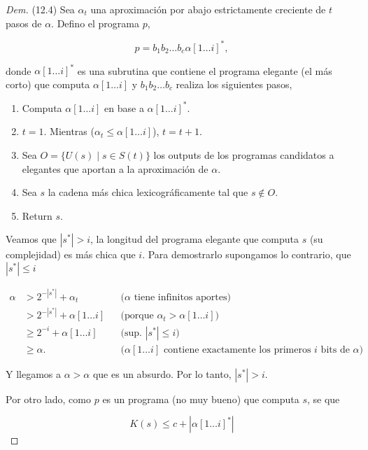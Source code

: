 \documentclass{article}
\theoremstyle{definition} %
\newcommand{\first}[2]{#2[1 \dots #1]}
\begin{document}
\begin{proof}[Dem](12.4)
    Sea $\alpha_t$ una aproximación por abajo estrictamente creciente de $t$
    pasos de $\alpha$. Defino el programa $p$,

    \[
        p = b_1 b_2 \dots b_c \first{i}{\alpha}^*,
    \]

    donde $\first{i}{\alpha}^*$ es una subrutina que contiene el programa
    elegante (el más corto) que computa $\first{i}{\alpha}$ y $b_1 b_2
    \dots b_c$ realiza los siguientes pasos,

    \begin{enumerate}
        \item Computa $\first{i}{\alpha}$ en base a
        $\first{i}{\alpha}^*$.
        \item $t = 1$. Mientras ($\alpha_t \leq \first{i}{\alpha}$), $t = t + 1$.
        \item Sea $O = \{ U(s) \mid s \in S(t) \}$ los outputs de los
        programas candidatos a elegantes que aportan a la aproximación de
        $\alpha$.
        \item Sea $s$ la cadena más chica lexicográficamente tal que $s \notin O$.
        \item Return $s$.
    \end{enumerate}

    Veamos que $|s^*| > i$, la longitud del programa elegante que computa $s$
    (su complejidad) es más chica que $i$. Para demostrarlo supongamos lo
    contrario, que $|s^*| \leq i$

    \begin{align*}
        \alpha 
        &> 2^{-|s^*|} + \alpha_t
            &&\text{($\alpha$ tiene infinitos aportes)}\\
        &> 2^{-|s^*|} + \first{i}{\alpha}
            &&\text{(porque $\alpha_t > \first{i}{\alpha}$)}\\
        &\geq 2^{-i} + \first{i}{\alpha}
            &&\text{(sup. $|s^*| \leq i$)}\\
        &\geq \alpha.
            &&\text{($\first{i}{\alpha}$ contiene exactamente los primeros $i$ bits de $\alpha$)}
    \end{align*}

    Y llegamos a $\alpha > \alpha$ que es un absurdo. Por lo tanto, $|s^*| > i$.
    
    Por otro lado, como $p$ es un programa (no muy bueno) que computa $s$, se que

    \begin{equation}\label{eq:comp}
         K(s) \leq c + |\first{i}{\alpha}^*|
    \end{equation}


\end{proof}
\end{document}

